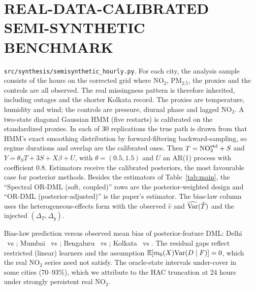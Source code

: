 \section{REAL-DATA-CALIBRATED SEMI-SYNTHETIC BENCHMARK}
\label{app:semisyn}
\texttt{src/synthesis/semisynthetic\_hourly.py}. For each city, the analysis sample consists of the hours on the corrected grid where NO$_2$, PM$_{2.5}$, the proxies and the controls are all observed. The real missingness pattern is therefore inherited, including outages and the shorter Kolkata record. The proxies are temperature, humidity and wind; the controls are pressure, diurnal phase and lagged NO$_2$. A two-state diagonal Gaussian HMM (five restarts) is calibrated on the standardized proxies. In each of 30 replications the true path is drawn from that HMM's exact smoothing distribution by forward-filtering backward-sampling, so regime durations and overlap are the calibrated ones. Then $T=\mathrm{NO}_2^{\rm std}+S$ and $Y=\theta_ST+3S+X\beta+U$, with $\theta=(0.5,1.5)$ and $U$ an AR(1) process with coefficient 0.8. Estimators receive the calibrated posteriors, the most favourable case for posterior methods. Besides the estimators of Table~\ref{tab:main}, the ``Spectral OR-DML (soft, coupled)'' rows are the posterior-weighted design and ``OR-DML (posterior-adjusted)'' is the paper's estimator. The bias-law column uses the heterogeneous-effects form with the observed $\hat v$ and $\widehat{\mathrm{Var}}(\tilde T)$ and the injected $(\Delta_T,\Delta_g)$.
\begin{table}[h]\centering\scriptsize
\caption{Semi-synthetic benchmark, all estimators (\texttt{reports/synthesis/semisynthetic\_hourly\_summary.csv}). Coverage: nominal 95\% intervals for the sample ATE.}\label{tab:ss_full}

\end{table}
Bias-law prediction versus observed mean bias of posterior-feature DML: Delhi \SSDelhiLaw\ vs \SSDelhiObs; Mumbai \SSMumbaiLaw\ vs \SSMumbaiObs; Bengaluru \SSBengaluruLaw\ vs \SSBengaluruObs; Kolkata \SSKolkataLaw\ vs \SSKolkataObs. The residual gaps reflect restricted (linear) learners and the assumption $\mathbb{E}[m_0(X)\mathrm{Var}(D\mid F)]=0$, which the real NO$_2$ series need not satisfy. The oracle-state intervals under-cover in some cities (70--93\%), which we attribute to the HAC truncation at 24 hours under strongly persistent real NO$_2$.

